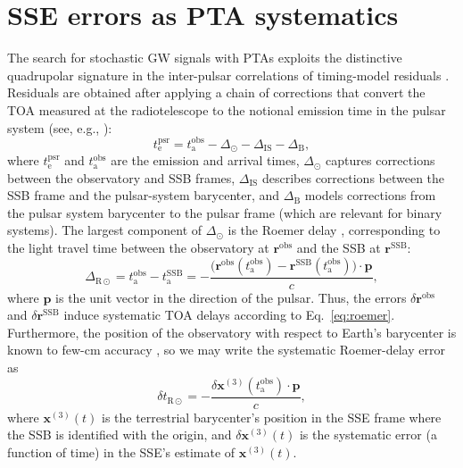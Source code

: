 \documentclass[iop,apj,twocolappendix]{emulateapj}
\begin{document}
\section{SSE errors as PTA systematics}
\label{sec:systematics}

The search for stochastic GW signals with PTAs exploits the distinctive quadrupolar signature in the inter-pulsar correlations of timing-model residuals \citep{hd83}.
Residuals are obtained after applying a chain of corrections that convert the TOA measured at the radiotelescope to the notional emission time in the pulsar system (see, e.g., \citealt{ehm06}):
%
\begin{equation}
    t_\mathrm{e}^\mathrm{psr} = t_\mathrm{a}^\mathrm{obs} - \Delta_\odot - \Delta_\mathrm{IS} - \Delta_\mathrm{B},
\end{equation}
%
where $t_\mathrm{e}^\mathrm{psr}$ and $t_\mathrm{a}^\mathrm{obs}$ are the emission and arrival times, $\Delta_\odot$ captures corrections between the observatory and SSB frames, $\Delta_\mathrm{IS}$ describes corrections between the SSB frame and the pulsar-system barycenter, and $\Delta_\mathrm{B}$ models corrections from the pulsar system barycenter to the pulsar frame (which are relevant for binary systems). The largest component of $\Delta_\odot$ is the Roemer delay \citep{roemer1676}, corresponding to the light travel time between the observatory at $\mathbf{r}^\mathrm{obs}$ and the SSB at $\mathbf{r}^\mathrm{SSB}$:
%
\begin{equation}
\label{eq:roemer}
\Delta_{\mathrm{R}\odot} =
t_\mathrm{a}^\mathrm{obs} - t_\mathrm{a}^\mathrm{SSB} =
-\frac{\bigl(\mathbf{r}^\mathrm{obs}(t_\mathrm{a}^\mathrm{obs}) - \mathbf{r}^\mathrm{SSB}(t_\mathrm{a}^\mathrm{obs})\bigr) \cdot \mathbf{p}}{c},
\end{equation}
%
where $\mathbf{p}$ is the unit vector in the direction of the pulsar. Thus, the errors $\delta \mathbf{r}^\mathrm{obs}$ and $\delta \mathbf{r}^\mathrm{SSB}$ induce systematic TOA delays according to Eq.\ \eqref{eq:roemer}.
Furthermore, the position of the observatory with respect to Earth's barycenter is known to few-cm accuracy \citep{ehm06}, so we may write the systematic Roemer-delay error as
%
\begin{equation}
\label{eq:deltar}
\delta t_{\mathrm{R}\odot} = -\frac{\delta \mathbf{x}^{(3)}(t_\mathrm{a}^\mathrm{obs})\cdot\mathbf{p}}{c},
\end{equation}
%
where $\mathbf{x}^{(3)}(t)$ is the terrestrial barycenter's position in the SSE frame where the SSB is identified with the origin, and $\delta \mathbf{x}^{(3)}(t)$ is the systematic error (a function of time) in the SSE's estimate of $\mathbf{x}^{(3)}(t)$.
\end{document}
